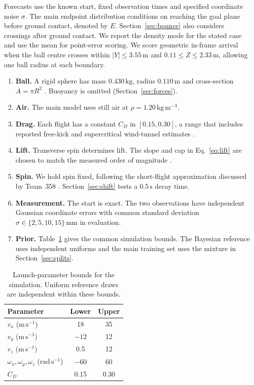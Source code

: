 \documentclass[11pt,a4paper]{article}
\begin{document}
Forecasts use the known start, fixed observation times and specified coordinate noise $\sigma$. The main endpoint distribution conditions on reaching the goal plane before ground contact, denoted by $E$. Section~\ref{sec:bounce} also considers crossings after ground contact. We report the density mode for the stated case and use the mean for point-error scoring. We score geometric in-frame arrival when the ball centre crosses within $|Y|\le 3.55\,\mathrm{m}$ and $0.11\le Z\le 2.33\,\mathrm{m}$, allowing one ball radius at each boundary.

\begin{enumerate}
  \item[\textbf{A1.}] \textbf{Ball.} A rigid sphere has mass $0.430\,\mathrm{kg}$, radius $0.110\,\mathrm{m}$ and cross-section $A=\pi R^2$ \cite{ifab}. Buoyancy is omitted (Section~\ref{sec:forces}).
  \item[\textbf{A2.}] \textbf{Air.} The main model uses still air at $\rho=1.20\,\mathrm{kg\,m^{-3}}$.
  \item[\textbf{A3.}] \textbf{Drag.} Each flight has a constant $C_D$ in $[0.15,0.30]$, a range that includes reported free-kick and supercritical wind-tunnel estimates \cite{bray2003,asai2007}.
  \item[\textbf{A4.}] \textbf{Lift.} Transverse spin determines lift. The slope and cap in Eq.~\eqref{eq:lift} are chosen to match the measured order of magnitude \cite{goff2010,asai2007}.
  \item[\textbf{A5.}] \textbf{Spin.} We hold spin fixed, following the short-flight approximation discussed by Team~358 \cite{team358}. Section~\ref{sec:shift} tests a $0.5\,\mathrm{s}$ decay time.
  \item[\textbf{A6.}] \textbf{Measurement.} The start is exact. The two observations have independent Gaussian coordinate errors with common standard deviation $\sigma\in\{2,5,10,15\}\,\mathrm{mm}$ in evaluation.
  \item[\textbf{A7.}] \textbf{Prior.} Table~\ref{tab:prior} gives the common simulation bounds. The Bayesian reference uses independent uniforms and the main training set uses the mixture in Section~\ref{sec:splits}.
\end{enumerate}

\begin{table}[htbp]
  \centering
  \caption{Launch-parameter bounds for the simulation. Uniform reference draws are independent within these bounds.}
  \label{tab:prior}
  \begin{tabular}{lcc}
    \toprule
    Parameter & Lower & Upper \\
    \midrule
    $v_x$ ($\mathrm{m\,s^{-1}}$) & 18 & 35 \\
    $v_y$ ($\mathrm{m\,s^{-1}}$) & $-12$ & 12 \\
    $v_z$ ($\mathrm{m\,s^{-1}}$) & 0.5 & 12 \\
    $\omega_x,\omega_y,\omega_z$ ($\mathrm{rad\,s^{-1}}$) & $-60$ & 60 \\
    $C_D$ & 0.15 & 0.30 \\
    \bottomrule
  \end{tabular}
\end{table}
\end{document}
